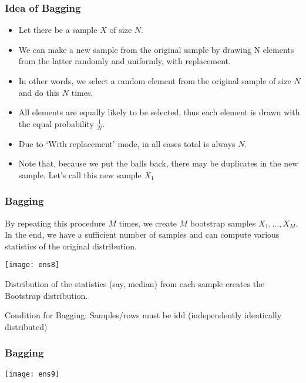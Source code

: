 \begin{frame}[fragile]\frametitle{Idea of Bagging}
\begin{itemize}
\item Let there be a sample $X$ of size $N$. 
\item We can make a new sample from the original sample by drawing N elements from the latter randomly and uniformly, with replacement. 
\item In other words, we select a random element from the original sample of size $N$ and do this $N$ times. 
\item All elements are equally likely to be selected, thus each element is drawn with the equal probability $\frac{1}{N}$.
\item Due to `With replacement' mode, in all cases total is always $N$.
\item Note that, because we put the balls back, there may be duplicates in the new sample. Let's call this new sample $X_1$
\end{itemize}
\end{frame}

\begin{frame}[fragile]\frametitle{Bagging}
By repeating this procedure $M$ times, we create $M$ bootstrap samples $X_1, \dots, X_M$. 
In the end, we have a sufficient number of samples and can compute various statistics of the original distribution.

\begin{center}
\texttt{[image: ens8]}
\end{center}

Distribution of the statistics (say, median) from each sample creates the Bootstrap distribution.

Condition for Bagging: Samples/rows must be idd (independently identically distributed)
\end{frame}


\begin{frame}[fragile]\frametitle{Bagging}
\begin{center}
\texttt{[image: ens9]}
\end{center}
\end{frame}






